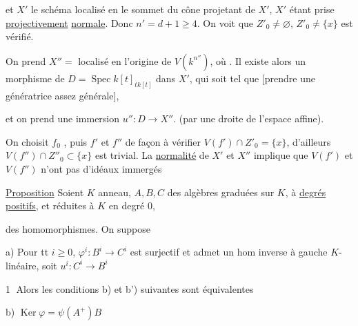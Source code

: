 et  $X'$ le schéma localisé en le sommet du cône projetant de $X'$, $X'$ étant prise \uline{projectivement} \uline{normale}. Donc $n'=d+1\geq4$.  On voit que  $Z'_0\ne\varnothing$, $Z'_0\ne\{x\}$ est vérifié.

On prend $X''=$  localisé en l'origine de $V(k^{n''})$, où . Il existe alors un morphisme  de $D=\operatorname{Spec} k[t]_{t k[t]}$ dans $X'$, qui soit tel que  [prendre une génératrice assez générale],

et on prend une immersion $u'':D\longrightarrow X''$. (par une droite de l'espace affine).

On choisit $f_0$ , puis $f'$ et $f''$ de façon à vérifier $V(f')\cap Z'_0=\{x\}$,  d'ailleurs $V(f'')\cap Z''_0\subset\{x\}$ est trivial. La \uline{normalité} de $X'$ et $X''$ implique que $V(f')$ et $V(f'')$ n'ont pas d'idéaux immergés \textendash\textendash

\uline{Proposition} Soient $K$ anneau, $A,B,C$ des algèbres graduées sur $K$, à \uline{degrés positifs}, et réduites à $K$ en degré $0$,



des homomorphismes. On suppose

a) Pour tt $i\geq0$, $\varphi^i:B^i\longrightarrow C^i$ est surjectif et admet un hom inverse à gauche $K$-linéaire, soit $u^i:C^i\longrightarrow B^i$

\textcircled{1} Alors les conditions b) et b') suivantes sont équivalentes

b)  $\operatorname{Ker}\varphi=\psi(A^+)B$


